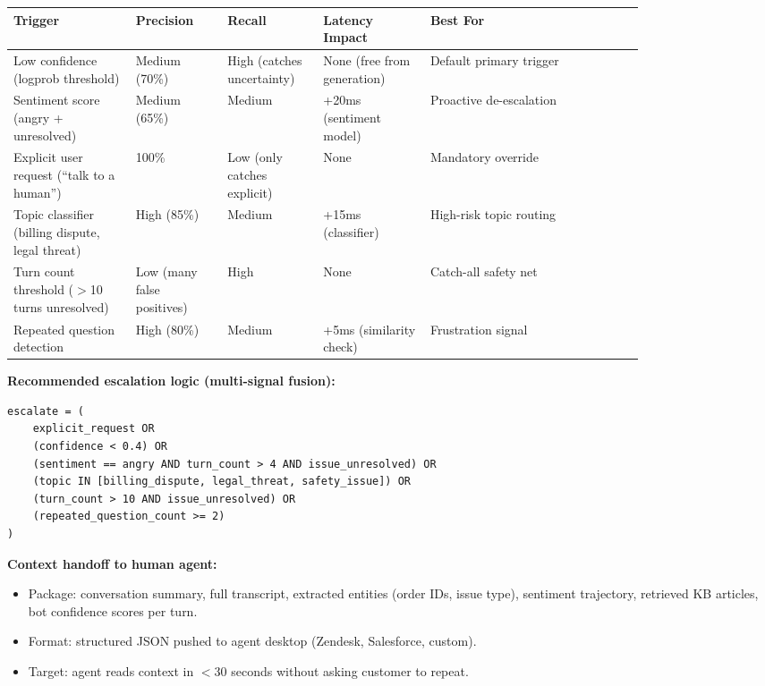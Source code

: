 \small
\begin{tabular}{|p{0.16\linewidth}|p{0.12\linewidth}|p{0.12\linewidth}|p{0.14\linewidth}|p{0.28\linewidth}|}
\hline
\textbf{Trigger} & \textbf{Precision} & \textbf{Recall} & \textbf{Latency Impact} & \textbf{Best For} \\
\hline
Low confidence (logprob threshold) & Medium (70\%) & High (catches uncertainty) & None (free from generation) & Default primary trigger \\
\hline
Sentiment score (angry + unresolved) & Medium (65\%) & Medium & +20ms (sentiment model) & Proactive de-escalation \\
\hline
Explicit user request (``talk to a human'') & 100\% & Low (only catches explicit) & None & Mandatory override \\
\hline
Topic classifier (billing dispute, legal threat) & High (85\%) & Medium & +15ms (classifier) & High-risk topic routing \\
\hline
Turn count threshold ($>$10 turns unresolved) & Low (many false positives) & High & None & Catch-all safety net \\
\hline
Repeated question detection & High (80\%) & Medium & +5ms (similarity check) & Frustration signal \\
\hline
\end{tabular}
\normalsize

\textbf{Recommended escalation logic (multi-signal fusion):}

\begin{verbatim}
escalate = (
    explicit_request OR
    (confidence < 0.4) OR
    (sentiment == angry AND turn_count > 4 AND issue_unresolved) OR
    (topic IN [billing_dispute, legal_threat, safety_issue]) OR
    (turn_count > 10 AND issue_unresolved) OR
    (repeated_question_count >= 2)
)
\end{verbatim}

\textbf{Context handoff to human agent:}

\begin{itemize}
  \item Package: conversation summary, full transcript, extracted entities (order IDs, issue type), sentiment trajectory, retrieved KB articles, bot confidence scores per turn.
  \item Format: structured JSON pushed to agent desktop (Zendesk, Salesforce, custom).
  \item Target: agent reads context in $<$30 seconds without asking customer to repeat.
\end{itemize}


